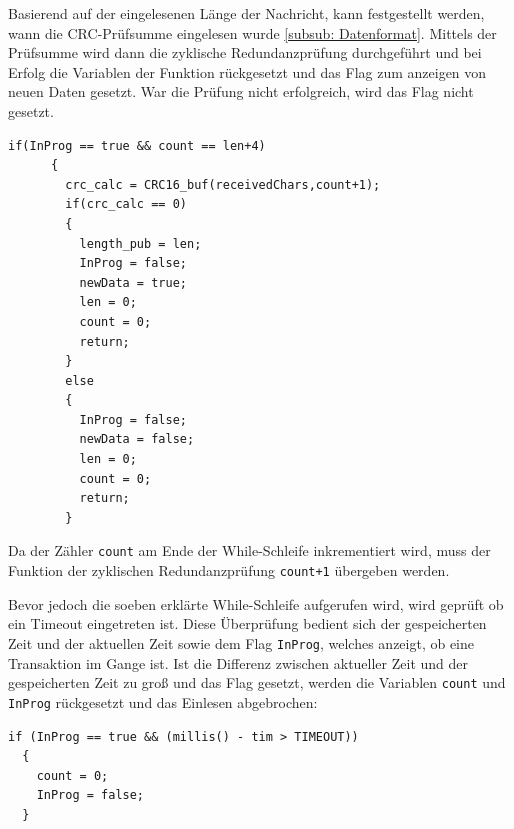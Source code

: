 \smallskip

Basierend auf der eingelesenen Länge der Nachricht, kann festgestellt werden, wann die CRC-Prüfsumme eingelesen wurde \ref{subsub: Datenformat}. Mittels der Prüfsumme
wird dann die zyklische Redundanzprüfung durchgeführt und bei Erfolg die Variablen der Funktion rückgesetzt und das Flag zum anzeigen von neuen Daten gesetzt. War die Prüfung
nicht erfolgreich, wird das Flag nicht gesetzt.

\begin{lstlisting}[caption={\textit{Zyklsiche Redundanzprüfung}}]
  if(InProg == true && count == len+4)
      {
        crc_calc = CRC16_buf(receivedChars,count+1); 
        if(crc_calc == 0)
        {
          length_pub = len;
          InProg = false; 
          newData = true; 
          len = 0;        
          count = 0;      
          return;
        }
        else
        {
          InProg = false;  
          newData = false; 
          len = 0;         
          count = 0;        
          return;         
        }
\end{lstlisting}

Da der Zähler \lstinline!count! am Ende der While-Schleife inkrementiert wird, muss der Funktion der zyklischen Redundanzprüfung \lstinline!count+1! übergeben werden.

\smallskip

Bevor jedoch die soeben erklärte While-Schleife aufgerufen wird, wird geprüft ob ein Timeout eingetreten ist. Diese Überprüfung bedient sich der gespeicherten Zeit und 
der aktuellen Zeit sowie dem Flag \lstinline!InProg!, welches anzeigt, ob eine Transaktion im Gange ist. Ist die Differenz zwischen aktueller Zeit und der gespeicherten Zeit
zu groß und das Flag gesetzt, werden die Variablen \lstinline!count! und \lstinline!InProg! rückgesetzt und das Einlesen abgebrochen:

\begin{lstlisting}[caption={\textit{Abbruch durch Timeout}}]
  if (InProg == true && (millis() - tim > TIMEOUT))
  {
    count = 0;
    InProg = false;
  }
\end{lstlisting}
